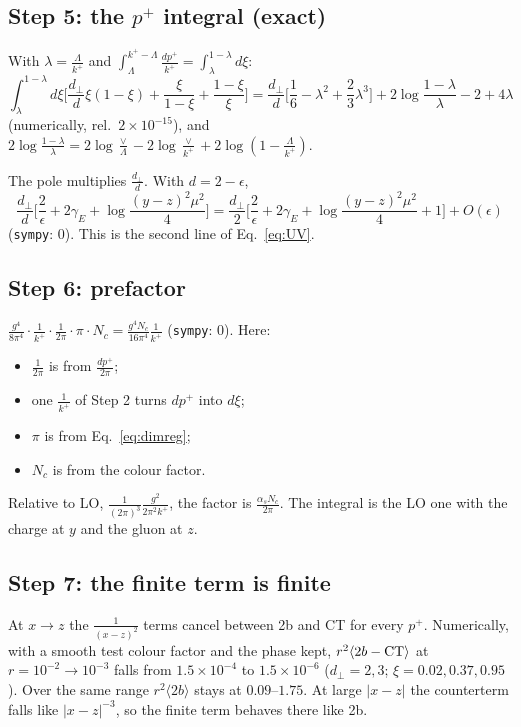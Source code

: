\documentclass[10pt]{article}
\numberwithin{equation}{section}
\begin{document}
\subsection*{Step 5: the \texorpdfstring{$p^+$}{p+} integral (exact)}
With $\lambda=\frac{\Lambda}{k^+}$ and $\int_\Lambda^{k^+-\Lambda}\frac{dp^+}{k^+}=\int_\lambda^{1-\lambda}d\xi$:
\begin{equation}
\int_\lambda^{1-\lambda}d\xi\Big[\frac{d_\perp}{d}\xi(1-\xi)+\frac{\xi}{1-\xi}+\frac{1-\xi}{\xi}\Big]=\frac{d_\perp}{d}\Big[\frac16-\lambda^2+\frac23\lambda^3\Big]+2\log\frac{1-\lambda}{\lambda}-2+4\lambda
\end{equation}
(numerically, rel.\ $2\times10^{-15}$), and $2\log\frac{1-\lambda}{\lambda}=2\log\frac{\vee}{\Lambda}-2\log\frac{\vee}{k^+}+2\log(1-\frac{\Lambda}{k^+})$.

The pole multiplies $\frac{d_\perp}{d}$. With $d=2-\epsilon$,
\begin{equation*}
\frac{d_\perp}{d}\Big[\frac2\epsilon+2\gamma_E+\log\frac{(y-z)^2\mu^2}{4}\Big]=\frac{d_\perp}{2}\Big[\frac2\epsilon+2\gamma_E+\log\frac{(y-z)^2\mu^2}{4}+1\Big]+O(\epsilon)
\end{equation*}
(\texttt{sympy}: $0$). This is the second line of Eq.~\eqref{eq:UV}.

\subsection*{Step 6: prefactor}
$\frac{g^4}{8\pi^4}\cdot\frac{1}{k^+}\cdot\frac{1}{2\pi}\cdot\pi\cdot N_c=\frac{g^4N_c}{16\pi^4}\frac{1}{k^+}$ (\texttt{sympy}: $0$). Here:
\begin{itemize}
\item $\frac{1}{2\pi}$ is from $\frac{dp^+}{2\pi}$;
\item one $\frac{1}{k^+}$ of Step 2 turns $dp^+$ into $d\xi$;
\item $\pi$ is from Eq.~\eqref{eq:dimreg};
\item $N_c$ is from the colour factor.
\end{itemize}
Relative to LO, $\frac{1}{(2\pi)^3}\frac{g^2}{2\pi^2k^+}$, the factor is $\frac{\alpha_sN_c}{2\pi}$. The integral is the LO one with the charge at $y$ and the gluon at $z$.

\subsection*{Step 7: the finite term is finite}
At $x\to z$ the $\frac{1}{(x-z)^2}$ terms cancel between 2b and CT for every $p^+$. Numerically, with a smooth test colour factor and the phase kept, $r^2\langle 2b-{\rm CT}\rangle$ at $r=10^{-2}\to10^{-3}$ falls from $1.5\times10^{-4}$ to $1.5\times10^{-6}$ ($d_\perp=2,3$; $\xi=0.02,0.37,0.95$). Over the same range $r^2\langle 2b\rangle$ stays at $0.09$--$1.75$. At large $|x-z|$ the counterterm falls like $|x-z|^{-3}$, so the finite term behaves there like 2b.
\end{document}
